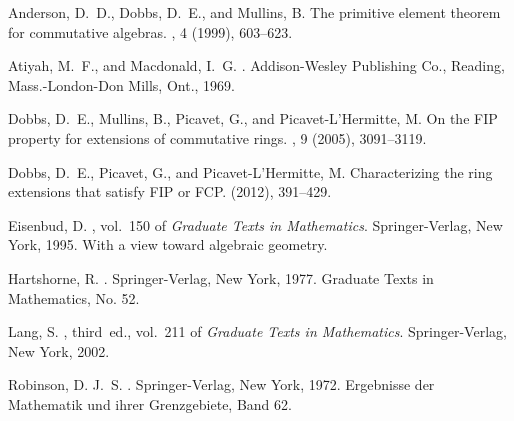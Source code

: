 \documentclass{amsart}
\theoremstyle{plain}
\theoremstyle{definition}
\begin{document}
\begin{thebibliography}{1}

{\sc Anderson, D.~D., Dobbs, D.~E., and Mullins, B.}
\newblock The primitive element theorem for commutative algebras.
, 4 (1999), 603--623.

{\sc Atiyah, M.~F., and Macdonald, I.~G.}
.
\newblock Addison-Wesley Publishing Co., Reading, Mass.-London-Don Mills, Ont.,
  1969.

{\sc Dobbs, D.~E., Mullins, B., Picavet, G., and Picavet-L'Hermitte, M.}
\newblock On the {FIP} property for extensions of commutative rings.
, 9 (2005), 3091--3119.

{\sc Dobbs, D.~E., Picavet, G., and Picavet-L'Hermitte, M.}
\newblock Characterizing the ring extensions that satisfy {FIP} or {FCP}.
 (2012), 391--429.

{\sc Eisenbud, D.}
, vol.~150 of {\em Graduate Texts in
  Mathematics}.
\newblock Springer-Verlag, New York, 1995.
\newblock With a view toward algebraic geometry.

{\sc Hartshorne, R.}
.
\newblock Springer-Verlag, New York, 1977.
\newblock Graduate Texts in Mathematics, No. 52.

{\sc Lang, S.}
, third~ed., vol.~211 of {\em Graduate Texts in
  Mathematics}.
\newblock Springer-Verlag, New York, 2002.

{\sc Robinson, D. J.~S.}
.
\newblock Springer-Verlag, New York, 1972.
\newblock Ergebnisse der Mathematik und ihrer Grenzgebiete, Band 62.

\end{thebibliography}
\end{document}
